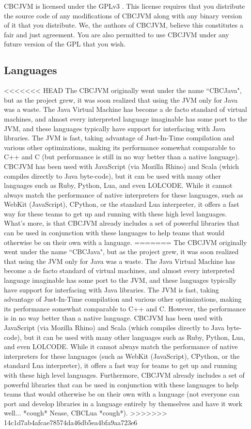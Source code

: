 \documentclass[12pt,letterpaper]{article}
\begin{document}
CBCJVM is licensed under the GPLv3 \cite{gpl3}. This license requires that you distribute the source code of any modifications of CBCJVM along with any binary version of it that you distribute. We, the authors of CBCJVM, believe this constitutes a fair and just agreement. You are also permitted to use CBCJVM under any future version of the GPL that you wish.



\subsection{Languages}

<<<<<<< HEAD
The CBCJVM originally went under the name ``CBCJava", but as the project grew, it was soon realized that using the JVM only for Java was a waste. The Java Virtual Machine has become a de facto standard of virtual machines, and almost every interpreted language imaginable has some port to the JVM, and these languages typically have support for interfacing with Java libraries. The JVM is fast, taking advantage of Just-In-Time compilation and various other optimizations, making its performance somewhat comparable to C++ and C (but performance is still in no way better than a native language). CBCJVM has been used with JavaScript (via Mozilla Rhino) and Scala (which compiles directly to Java byte-code), but it can be used with many other languages such as Ruby, Python, Lua, and even LOLCODE. While it cannot always match the performance of native interpreters for these languages, such as WebKit (JavaScript), CPython, or the standard Lua interpreter, it offers a fast way for these teams to get up and running with these high level languages. What's more, is that CBCJVM already includes a set of powerful libraries that can be used in conjunction with these languages to help teams that would otherwise be on their own with a language.
=======
The CBCJVM originally went under the name ``CBCJava", but as the project grew, it was soon realized that using the JVM only for Java was a waste. The Java Virtual Machine has become a de facto standard of virtual machines, and almost every interpreted language imaginable has some port to the JVM, and these languages typically have support for interfacing with Java libraries. The JVM is fast, taking advantage of Just-In-Time compilation and various other optimizations, making its performance somewhat comparable to C++ and C. However, the performance is  in no way better than a native language. CBCJVM has been used with JavaScript (via Mozilla Rhino) and Scala (which compiles directly to Java byte-code), but it can be used with many other languages such as Ruby, Python, Lua, and even LOLCODE. While it cannot always match the performance of native interpreters for these languages (such as WebKit (JavaScript), CPython, or the standard Lua interpreter), it offers a fast way for teams to get up and running with these high level languages. Furthermore, CBCJVM already includes a set of powerful libraries that can be used in conjunction with these languages to help teams that would otherwise be on their own with a language (not everyone can port and develop libraries in a language entirely by themselves and have it work well... *cough* Nease, CBCLua *cough*).
>>>>>>> 14c1d7ab4afcae78574da46db5ea4bfa9aa723e6
\end{document}
